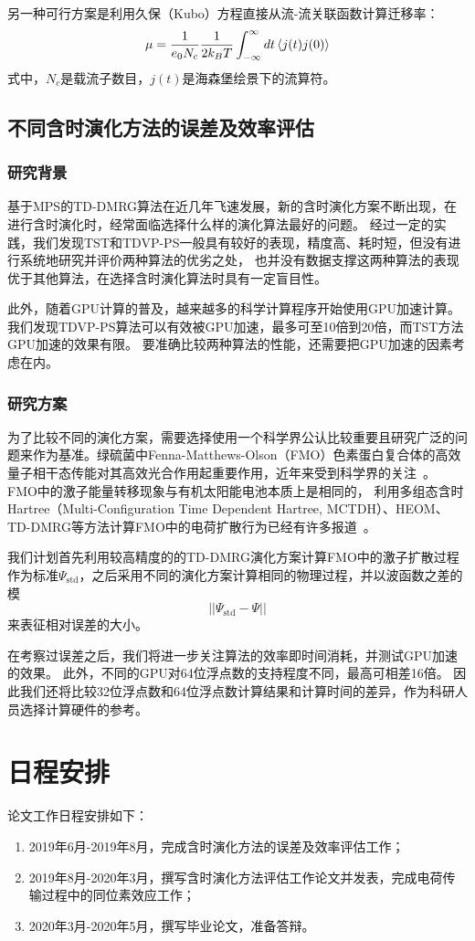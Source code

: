 \documentclass{article}
\begin{document}
另一种可行方案是利用久保（Kubo）方程直接从流-流关联函数计算迁移率：
\begin{equation}
    \mu = \frac{1}{e_0 N_c} \frac{1}{2k_B T} \int_{-\infty}^{\infty} dt \braket{j(t)j(0)}
\end{equation}
式中，$N_c$是载流子数目，$j(t)$是海森堡绘景下的流算符。


\subsection{不同含时演化方法的误差及效率评估}
\subsubsection{研究背景}
基于MPS的TD-DMRG算法在近几年飞速发展，新的含时演化方案不断出现，在进行含时演化时，经常面临选择什么样的演化算法最好的问题。
经过一定的实践，我们发现TST和TDVP-PS一般具有较好的表现，精度高、耗时短，但没有进行系统地研究并评价两种算法的优劣之处，
也并没有数据支撑这两种算法的表现优于其他算法，在选择含时演化算法时具有一定盲目性。

此外，随着GPU计算的普及，越来越多的科学计算程序开始使用GPU加速计算。
我们发现TDVP-PS算法可以有效被GPU加速，最多可至10倍到20倍，而TST方法GPU加速的效果有限。
要准确比较两种算法的性能，还需要把GPU加速的因素考虑在内。

\subsubsection{研究方案}
为了比较不同的演化方案，需要选择使用一个科学界公认比较重要且研究广泛的问题来作为基准。绿硫菌中Fenna-Matthews-Olson（FMO）色素蛋白复合体的高效量子相干态传能对其高效光合作用起重要作用，近年来受到科学界的关注~\cite{Cheng09, Coker16}。
FMO中的激子能量转移现象与有机太阳能电池本质上是相同的，
利用多组态含时Hartree（Multi-Configuration Time Dependent Hartree, MCTDH）、HEOM、TD-DMRG等方法计算FMO中的电荷扩散行为已经有许多报道~\cite{Kühn16, Shi18, Borrel17}。

我们计划首先利用较高精度的的TD-DMRG演化方案计算FMO中的激子扩散过程作为标准$\Psi_{\textrm{std}}$，之后采用不同的演化方案计算相同的物理过程，并以波函数之差的模
$$
|| \Psi_{\textrm{std}} - \Psi||
$$
来表征相对误差的大小。

在考察过误差之后，我们将进一步关注算法的效率即时间消耗，并测试GPU加速的效果。
此外，不同的GPU对64位浮点数的支持程度不同，最高可相差16倍。
因此我们还将比较32位浮点数和64位浮点数计算结果和计算时间的差异，作为科研人员选择计算硬件的参考。

\section{日程安排}
论文工作日程安排如下：
\begin{enumerate}
    \item 2019年6月-2019年8月，完成含时演化方法的误差及效率评估工作；
    \item 2019年8月-2020年3月，撰写含时演化方法评估工作论文并发表，完成电荷传输过程中的同位素效应工作；
    \item 2020年3月-2020年5月，撰写毕业论文，准备答辩。
\end{enumerate}




\end{document}
